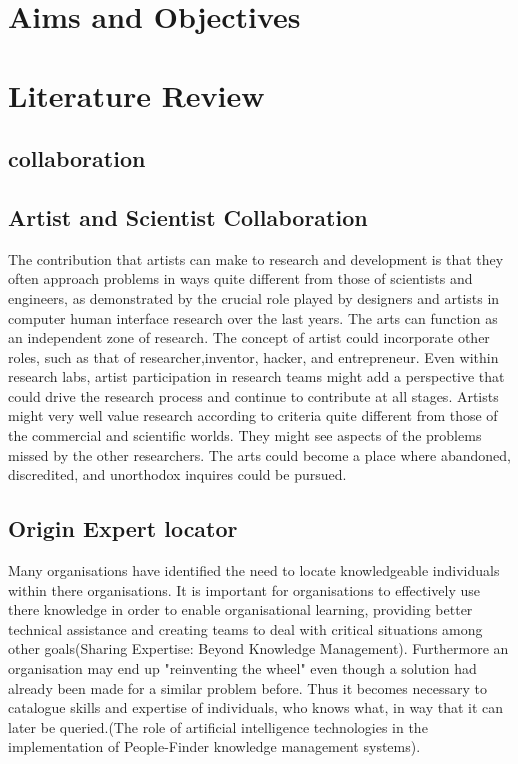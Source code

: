 \documentclass[a4paper,oneside,11pt]{report}
\begin{document}
\tableofcontents


\chapter{Aims and Objectives}
\chapter{Literature Review}
\section{collaboration}
\section{Artist and Scientist Collaboration}
The contribution that artists can make to research and development is that they often
approach problems in ways quite different from those of scientists and engineers, as
demonstrated by the crucial role played by designers and artists in computer human
interface research over the last years. The arts can function as an independent zone of
research. The concept of artist could incorporate other roles, such as that of researcher,inventor, hacker, and entrepreneur. Even within research labs, artist participation in
research teams might add a perspective that could drive the research process and continue
to contribute at all stages. Artists might very well value research according to criteria quite different from those of the commercial and scientiﬁc worlds. They might see aspects of the problems missed by the other researchers. The arts could become a place where abandoned, discredited,
and unorthodox inquires could be pursued.
\section{Origin Expert locator}
Many organisations have identified the need to locate knowledgeable individuals within there organisations. It is important for organisations to effectively use there knowledge in order to enable organisational learning, providing better technical assistance and creating teams to deal with critical situations among other goals(Sharing Expertise: Beyond Knowledge Management). Furthermore an organisation may end up "reinventing the wheel" even though a solution had already been made for a similar problem before. Thus it becomes necessary to catalogue skills and expertise of individuals, who knows what,  in way that it can later be queried.(The role of artificial intelligence technologies in the implementation of People-Finder knowledge management systems). 
\end{document}
